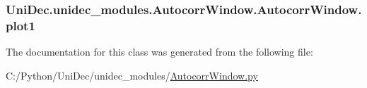 \subsubsection[{plot1}]{\setlength{\rightskip}{0pt plus 5cm}Uni\+Dec.\+unidec\+\_\+modules.\+Autocorr\+Window.\+Autocorr\+Window.\+plot1}\label{class_uni_dec_1_1unidec__modules_1_1_autocorr_window_1_1_autocorr_window_a289a385211c513dcbd32329fb2ba992e}


The documentation for this class was generated from the following file\+:\begin{DoxyCompactItemize}
\item 
C\+:/\+Python/\+Uni\+Dec/unidec\+\_\+modules/\hyperlink{_autocorr_window_8py}{Autocorr\+Window.\+py}\end{DoxyCompactItemize}
